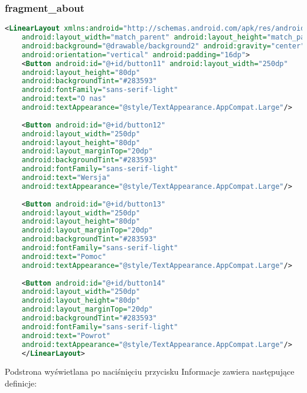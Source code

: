 \subsubsection{fragment\_about}
\begin{lstlisting}[caption=Fragment\_about, label={lst:kod.xml}, language=XML]
	<LinearLayout xmlns:android="http://schemas.android.com/apk/res/android"
	android:layout_width="match_parent" android:layout_height="match_parent"
	android:background="@drawable/background2" android:gravity="center"
	android:orientation="vertical" android:padding="16dp">
	<Button android:id="@+id/button11" android:layout_width="250dp"
	android:layout_height="80dp"
	android:backgroundTint="#283593"
	android:fontFamily="sans-serif-light"
	android:text="O nas"
	android:textAppearance="@style/TextAppearance.AppCompat.Large"/>
	
	<Button android:id="@+id/button12"
	android:layout_width="250dp"
	android:layout_height="80dp"
	android:layout_marginTop="20dp"
	android:backgroundTint="#283593"
	android:fontFamily="sans-serif-light"
	android:text="Wersja"
	android:textAppearance="@style/TextAppearance.AppCompat.Large"/>
	
	<Button android:id="@+id/button13"
	android:layout_width="250dp"
	android:layout_height="80dp"
	android:layout_marginTop="20dp"
	android:backgroundTint="#283593"
	android:fontFamily="sans-serif-light"
	android:text="Pomoc"
	android:textAppearance="@style/TextAppearance.AppCompat.Large"/>
	
	<Button android:id="@+id/button14"
	android:layout_width="250dp"
	android:layout_height="80dp"
	android:layout_marginTop="20dp"
	android:backgroundTint="#283593"
	android:fontFamily="sans-serif-light"
	android:text="Powrot"
	android:textAppearance="@style/TextAppearance.AppCompat.Large"/>
	</LinearLayout>
\end{lstlisting}
\hspace{0.60cm} Podstrona wyświetlana po naciśnięciu przycisku Informacje zawiera następujące definicje:

